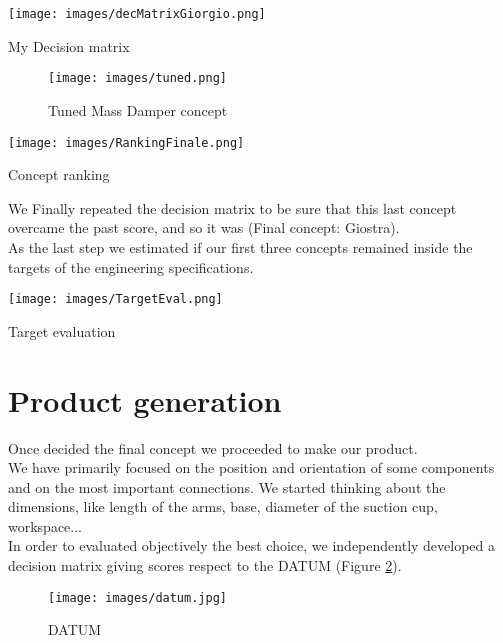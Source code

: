 \documentclass[11pt,a4paper]{article}
\begin{document}
	\bigskip
	
	\begin{table}[H]
		\centering
		\texttt{[image: images/decMatrixGiorgio.png]}
		\caption{My Decision matrix}
		\label{My Decision matrix}
	\end{table}

	\newpage
	\begin{figure}[H]
		\centering
		\texttt{[image: images/tuned.png]}
		\caption{Tuned Mass Damper concept}
		\label{tuned}
	\end{figure}

	\begin{table}[H]
		\centering
		\texttt{[image: images/RankingFinale.png]}
		\caption{Concept ranking}
		\label{Concept ranking}
	\end{table}

	\medskip
	
	We Finally repeated the decision matrix to be sure that this last concept overcame the past score, and so it was (Final concept: Giostra). \\
	As the last step we estimated if our first three concepts remained inside the targets of the engineering specifications. \\
	
	
	\begin{table}[H]
		\centering
		\texttt{[image: images/TargetEval.png]}
		\caption{Target evaluation}
		\label{Target evaluation}
	\end{table}
	
\newpage

\section{Product generation}
	Once decided the final concept we proceeded to make our product. \\
	We have primarily focused on the position and orientation of some components and on the most important connections. We started thinking about the dimensions, like length of the arms, base, diameter of the suction cup, workspace... \\
	In order to evaluated objectively the best choice, we independently developed a decision matrix giving scores respect to the DATUM (Figure \ref{DATUM}).\\
	\begin{figure}[H]
		\centering
		\texttt{[image: images/datum.jpg]}
		\caption{DATUM}
		\label{DATUM}
	\end{figure}
 
\end{document}
